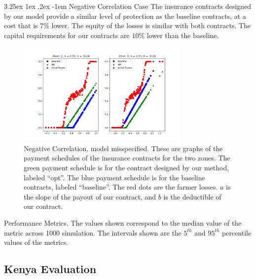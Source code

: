 \documentclass[11pt]{article}
\makeatletter
\renewcommand\paragraph{\@startsection{paragraph}{5}{\z@}%
  {3.25ex \@plus1ex \@minus.2ex}%
  {-1em}%
  {\normalfont\normalsize\bfseries}}
\makeatother
\begin{document}
        \paragraph{Negative Correlation Case} The insurance contracts designed by our model provide a similar level of protection as the baseline contracts, at a cost that is $7\%$ lower. The equity of the losses is similar with both contracts. The capital requirements for our contracts are $10\%$ lower than the baseline. 
        \begin{figure}[H]
            \centering
            \includegraphics[width=0.75\textwidth]{../../output/figures/Logit_Bootstrap/neg_corr_nonlinear_premium.png}
            \caption{Negative Correlation, model misspecified. These are graphs of the payment schedules of the insurance contracts for the two zones. The green payment schedule is for the contract designed by our method, labeled ``opt''. The blue payment schedule is for the baseline contracts, labeled ``baseline''. The red dots are the farmer losses. $a$ is the slope of the payout of our contract, and $b$ is the deductible of our contract.}
        \end{figure}

        \begin{table}[H]
            \centering
            
            
            \caption{Performance Metrics. The values shown correspond to the median value of the metric across 1000 simulation. The intervals shown are the $5^{th}$ and $95^{th}$ percentile values of the metrics.}
        \end{table}
        \FloatBarrier
  
  \subsection{Kenya Evaluation}
\end{document}
